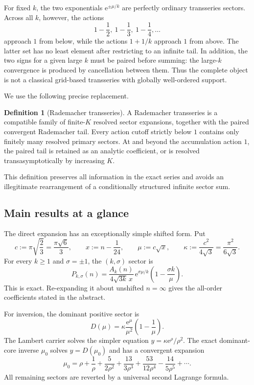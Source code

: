 \documentclass[11pt,a4paper]{article}
\numberwithin{equation}{section}
\theoremstyle{definition}
\newtheorem{definition}[theorem]{Definition}
\theoremstyle{remark}
\newcommand{\e}{\mathrm e}
\begin{document}
For fixed $k$, the two exponentials $\e^{\pm\mu/k}$ are perfectly ordinary
transseries sectors.  Across all $k$, however, the actions
\[
 1-\frac12,\ 1-\frac13,\ 1-\frac14,\ldots
\]
approach $1$ from below, while the actions $1+1/k$ approach $1$ from above.
The latter set has no least element after restricting to an infinite tail.  In
addition, the two signs for a given large $k$ must be paired before summing: the
large-$k$ convergence is produced by cancellation between them.  Thus the
complete object is not a classical grid-based transseries with globally
well-ordered support.

We use the following precise replacement.

\begin{definition}[Rademacher transseries]\label{def:rademacher-transseries}
A Rademacher transseries is a compatible family of finite-$K$ resolved sector
expansions, together with the paired convergent Rademacher tail.  Every action
cutoff strictly below $1$ contains only finitely many resolved primary sectors.
At and beyond the accumulation action $1$, the paired tail is retained as an
analytic coefficient, or is resolved transasymptotically by increasing $K$.
\end{definition}

This definition preserves all information in the exact series and avoids an
illegitimate rearrangement of a conditionally structured infinite sector sum.

\subsection{Main results at a glance}

The direct expansion has an exceptionally simple shifted form.  Put
\begin{equation}\label{eq:basic-constants}
 c:=\pi\sqrt{\frac23}=\frac{\pi\sqrt6}{3},\qquad
 x:=n-\frac1{24},\qquad \mu:=c\sqrt x,
 \qquad \kappa:=\frac{c^2}{4\sqrt3}=\frac{\pi^2}{6\sqrt3}.
\end{equation}
For every $k\geq1$ and $\sigma=\pm1$, the $(k,\sigma)$ sector is
\begin{equation}\label{eq:sector-preview}
 P_{k,\sigma}(n)=
 \frac{A_k(n)}{4\sqrt{3k}\,x}\,
 \e^{\sigma\mu/k}\left(1-\frac{\sigma k}{\mu}\right).
\end{equation}
This is exact.  Re-expanding it about unshifted $n=\infty$ gives the all-order
coefficients stated in the abstract.

For inversion, the dominant positive sector is
\begin{equation}\label{eq:dominant-preview}
 D(\mu)=\kappa\frac{\e^\mu}{\mu^2}
 \left(1-\frac1\mu\right).
\end{equation}
The Lambert carrier solves the simpler equation
$y=\kappa\e^\rho/\rho^2$.  The exact dominant-core inverse $\mu_0$ solves
$y=D(\mu_0)$ and has a convergent expansion
\begin{equation}\label{eq:mu0-preview}
 \mu_0=\rho+\frac1\rho+\frac{5}{2\rho^2}
 +\frac{13}{3\rho^3}+\frac{53}{12\rho^4}-\frac{14}{5\rho^5}+\cdots.
\end{equation}
All remaining sectors are reverted by a universal second Lagrange formula.
\end{document}
